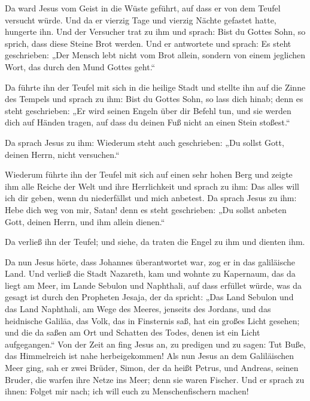  Da ward Jesus vom Geist in die Wüste geführt, auf dass er
von dem Teufel versucht würde.  Und da er vierzig Tage und
vierzig Nächte gefastet hatte, hungerte ihn.  Und der
Versucher trat zu ihm und sprach: Bist du Gottes Sohn, so sprich, dass
diese Steine Brot werden.  Und er antwortete und sprach:
Es steht geschrieben: „Der Mensch lebt nicht vom Brot allein, sondern
von einem jeglichen Wort, das durch den Mund Gottes geht.``

 Da führte ihn der Teufel mit sich in die heilige Stadt
und stellte ihn auf die Zinne des Tempels  und sprach zu
ihm: Bist du Gottes Sohn, so lass dich hinab; denn es steht geschrieben:
„Er wird seinen Engeln über dir Befehl tun, und sie werden dich auf
Händen tragen, auf dass du deinen Fuß nicht an einen Stein stoßest.``

 Da sprach Jesus zu ihm: Wiederum steht auch geschrieben:
„Du sollst Gott, deinen Herrn, nicht versuchen.``

 Wiederum führte ihn der Teufel mit sich auf einen sehr
hohen Berg und zeigte ihm alle Reiche der Welt und ihre Herrlichkeit
 und sprach zu ihm: Das alles will ich dir geben, wenn du
niederfällst und mich anbetest.  Da sprach Jesus zu ihm:
Hebe dich weg von mir, Satan! denn es steht geschrieben: „Du sollst
anbeten Gott, deinen Herrn, und ihm allein dienen.``

 Da verließ ihn der Teufel; und siehe, da traten die
Engel zu ihm und dienten ihm.

 Da nun Jesus hörte, dass Johannes überantwortet war, zog
er in das galiläische Land.  Und verließ die Stadt
Nazareth, kam und wohnte zu Kapernaum, das da liegt am Meer, im Lande
Sebulon und Naphthali,  auf dass erfüllet würde, was da
gesagt ist durch den Propheten Jesaja, der da spricht: 
„Das Land Sebulon und das Land Naphthali, am Wege des Meeres, jenseits
des Jordans, und das heidnische Galiläa,  das Volk, das
in Finsternis saß, hat ein großes Licht gesehen; und die da saßen am Ort
und Schatten des Todes, denen ist ein Licht aufgegangen.``
 Von der Zeit an fing Jesus an, zu predigen und zu sagen:
Tut Buße, das Himmelreich ist nahe herbeigekommen!  Als
nun Jesus an dem Galiläischen Meer ging, sah er zwei Brüder, Simon, der
da heißt Petrus, und Andreas, seinen Bruder, die warfen ihre Netze ins
Meer; denn sie waren Fischer.  Und er sprach zu ihnen:
Folget mir nach; ich will euch zu Menschenfischern machen!

